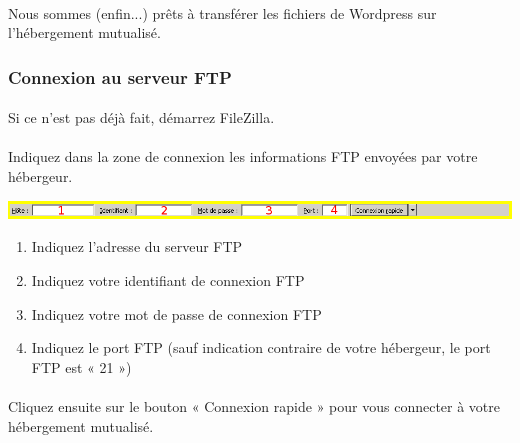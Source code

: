 \documentclass[10pt,a4paper]{article}
\begin{document}
\paragraph{}Nous sommes (enfin...) prêts à transférer les fichiers de Wordpress sur l'hébergement mutualisé.
\subsubsection{Connexion au serveur FTP}
\paragraph{}Si ce n'est pas déjà fait, démarrez FileZilla.
\paragraph{}Indiquez dans la zone de connexion les informations FTP envoyées par votre hébergeur.
\begin{center}
\includegraphics[scale=0.4]{img/0032.png}
\end{center}
\begin{enumerate}
\item Indiquez l'adresse du serveur FTP
\item Indiquez votre identifiant de connexion FTP
\item Indiquez votre mot de passe de connexion FTP
\item Indiquez le port FTP (sauf indication contraire de votre hébergeur, le port FTP est « 21 »)
\end{enumerate}
\paragraph{}Cliquez ensuite sur le bouton « Connexion rapide » pour vous connecter à votre hébergement mutualisé.
\end{document}
